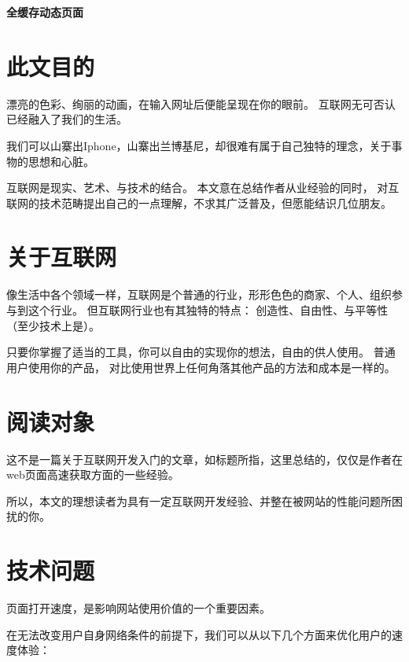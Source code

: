 \documentclass{article}
\begin{document}
  \begin{center}
    \huge \bf  全缓存动态页面
  \end{center}

  \section{此文目的}
  漂亮的色彩、绚丽的动画，在输入网址后便能呈现在你的眼前。 互联网无可否认已经融入了我们的生活。

  我们可以山寨出Iphone，山寨出兰博基尼，却很难有属于自己独特的理念，关于事物的思想和心脏。

  互联网是现实、艺术、与技术的结合。 本文意在总结作者从业经验的同时，
  对互联网的技术范畴提出自己的一点理解，不求其广泛普及，但愿能结识几位朋友。

  
  \section{关于互联网}
  像生活中各个领域一样，互联网是个普通的行业，形形色色的商家、个人、组织参与到这个行业。
  但互联网行业也有其独特的特点： 创造性、自由性、与平等性（至少技术上是）。

  只要你掌握了适当的工具，你可以自由的实现你的想法，自由的供人使用。 普通用户使用你的产品，
  对比使用世界上任何角落其他产品的方法和成本是一样的。
  

  \section{阅读对象}
  这不是一篇关于互联网开发入门的文章，如标题所指，这里总结的，仅仅是作者在web页面高速获取方面的一些经验。

  所以，本文的理想读者为具有一定互联网开发经验、并整在被网站的性能问题所困扰的你。

  \section{技术问题}

  页面打开速度，是影响网站使用价值的一个重要因素。

  在无法改变用户自身网络条件的前提下，我们可以从以下几个方面来优化用户的速度体验：
\end{document}
